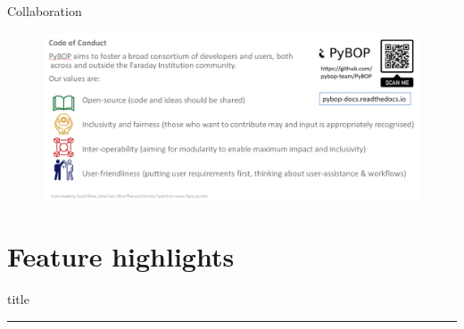 \documentclass[aspectratio=169]{beamer}
\begin{document}
\begin{frame}{Collaboration}
    \vspace{-6mm}
    \begin{figure}
        \centering
        \includegraphics[width=\textwidth]{Images/Code_of_Conduct.png}
    \end{figure}
\end{frame}

\section{Feature highlights}
\begin{frame}[plain]
    \centering
    \begin{beamercolorbox}[sep=8pt,center,shadow=true,rounded=true]{title}
    \insertsectionhead\par%
    \color{oxfordblue}\noindent\rule{10cm}{1pt} \\
    \LARGE{\faBatteryThreeQuarters} \\
    \end{beamercolorbox}
\end{frame}
\end{document}
